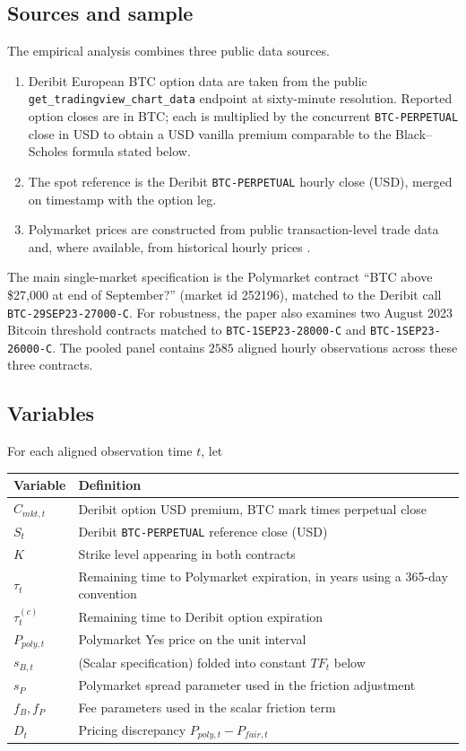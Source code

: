 \documentclass[11pt]{article}
\numberwithin{equation}{section}
\theoremstyle{plain}
\begin{document}
\subsection{Sources and sample}
The empirical analysis combines three public data sources.
\begin{enumerate}
    \item Deribit European BTC option data are taken from the public \texttt{get\_tradingview\_chart\_data} endpoint at sixty-minute resolution. Reported option closes are in BTC; each is multiplied by the concurrent \texttt{BTC-PERPETUAL} close in USD to obtain a USD vanilla premium comparable to the Black--Scholes formula stated below.
    \item The spot reference is the Deribit \texttt{BTC-PERPETUAL} hourly close (USD), merged on timestamp with the option leg.
    \item Polymarket prices are constructed from public transaction-level trade data and, where available, from historical hourly prices \citep{polymarketdocs}.
\end{enumerate}

The main single-market specification is the Polymarket contract ``BTC above \$27{,}000 at end of September?'' (market id 252196), matched to the Deribit call \texttt{BTC-29SEP23-27000-C}. For robustness, the paper also examines two August 2023 Bitcoin threshold contracts matched to \texttt{BTC-1SEP23-28000-C} and \texttt{BTC-1SEP23-26000-C}. The pooled panel contains $2585$ aligned hourly observations across these three contracts.

\subsection{Variables}
For each aligned observation time $t$, let
\begin{center}
\begin{tabular}{ll}
\toprule
Variable & Definition \\
\midrule
$C_{mkt,t}$ & Deribit option USD premium, BTC mark times perpetual close \\
$S_t$ & Deribit \texttt{BTC-PERPETUAL} reference close (USD) \\
$K$ & Strike level appearing in both contracts \\
$\tau_t$ & Remaining time to Polymarket expiration, in years using a 365-day convention \\
$\tau_t^{(c)}$ & Remaining time to Deribit option expiration \\
$P_{poly,t}$ & Polymarket Yes price on the unit interval \\
$s_{B,t}$ & (Scalar specification) folded into constant $TF_t$ below \\
$s_P$ & Polymarket spread parameter used in the friction adjustment \\
$f_B,f_P$ & Fee parameters used in the scalar friction term \\
$D_t$ & Pricing discrepancy $P_{poly,t}-P_{fair,t}$ \\
\bottomrule
\end{tabular}
\end{center}
\end{document}
